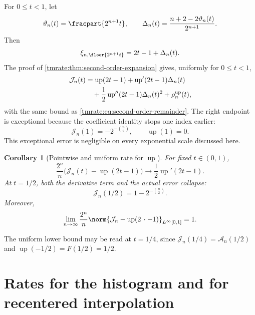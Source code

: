 \documentclass[11pt,oneside]{article}
\newtheorem{corollary}[theorem]{Corollary}
\theoremstyle{definition}
\theoremstyle{remark}
\newcommand{\Up}{\operatorname{up}}
\begin{document}
For $0\le t<1$, let
\begin{equation}
 \vartheta_n(t)=\fracpart{2^{n+1}t},
 \qquad
 \Delta_n(t)=\frac{n+2-2\vartheta_n(t)}{2^{n+1}}.          \label{tmrate:eq:Delta-up}
\end{equation}
Then
\begin{equation}
 \xi_{n,\floor{2^{n+1}t}}=2t-1+\Delta_n(t).                \label{tmrate:eq:up-center-drift}
\end{equation}
The proof of \cref{tmrate:thm:second-order-expansion} gives, uniformly for $0\le t<1$,
\begin{align}
 \mathcal J_n(t)
 &=\Up(2t-1)+\Up'(2t-1)\Delta_n(t) \notag\\
 &\quad+\frac12\Up''(2t-1)\Delta_n(t)^2+\rho_n^{\Up}(t), \label{tmrate:eq:up-second-order}
\end{align}
with the same bound as \eqref{tmrate:eq:second-order-remainder}.  The right endpoint is
exceptional because the coefficient identity stops one index earlier:
\begin{equation}
 \mathcal J_n(1)=-2^{-\binom n2},
 \qquad \Up(1)=0.                                         \label{tmrate:eq:J-right-endpoint}
\end{equation}
This exceptional error is negligible on every exponential scale discussed here.

\begin{corollary}[Pointwise and uniform rate for $\Up$]
\label{tmrate:cor:up-rate}
For fixed $t\in(0,1)$,
\begin{equation}
 \frac{2^n}{n}
 \bigl(\mathcal J_n(t)-\Up(2t-1)\bigr)
 \longrightarrow\frac12\Up'(2t-1).                       \label{tmrate:eq:up-pointwise-rate}
\end{equation}
At $t=1/2$, both the derivative term and the actual error collapse:
\begin{equation}
 \mathcal J_n(1/2)=1-2^{-\binom n2}.                       \label{tmrate:eq:J-half}
\end{equation}
Moreover,
\begin{equation}
 \lim_{n\to\infty}\frac{2^n}{n}
 \norm{\mathcal J_n-\Up(2\,\cdot-1)}_{L^\infty[0,1]}=1.  \label{tmrate:eq:up-uniform-rate}
\end{equation}
\end{corollary}

The uniform lower bound may be read at $t=1/4$, since
$\mathcal J_n(1/4)=\mathcal A_n(1/2)$ and
$\Up(-1/2)=F(1/2)=1/2$.

\section{Rates for the histogram and for recentered interpolation}
\label{tmrate:sec:other-rates}
\end{document}
